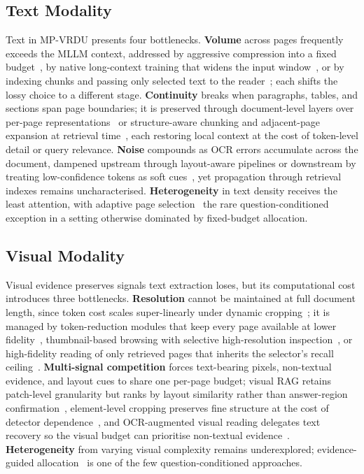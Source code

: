 \documentclass[11pt]{article}
\begin{document}
\subsection{Text Modality}
\label{sec:modality-text}
Text in MP-VRDU presents four bottlenecks. \textbf{Volume} across pages frequently exceeds the MLLM context, addressed by aggressive compression into a fixed budget~\cite{borchmann2025arctic, dong2024multi}, by native long-context training that widens the input window~\cite{duan2025docopilot}, or by indexing chunks and passing only selected text to the reader~\cite{xie2024wukong, zhang2024cream}; each shifts the lossy choice to a different stage. \textbf{Continuity} breaks when paragraphs, tables, and sections span page boundaries; it is preserved through document-level layers over per-page representations~\cite{tito2023hierarchical, blau2024gram} or structure-aware chunking and adjacent-page expansion at retrieval time~\cite{shin2025multidocfusion, qian2026accurate}, each restoring local context at the cost of token-level detail or query relevance. \textbf{Noise} compounds as OCR errors accumulate across the document, dampened upstream through layout-aware pipelines or downstream by treating low-confidence tokens as soft cues~\cite{hannan2025docslm}, yet propagation through retrieval indexes remains uncharacterised. \textbf{Heterogeneity} in text density receives the least attention, with adaptive page selection~\cite{li2025avir} the rare question-conditioned exception in a setting otherwise dominated by fixed-budget allocation.

\subsection{Visual Modality}
\label{sec:modality-visual}
Visual evidence preserves signals text extraction loses, but its computational cost introduces three bottlenecks. \textbf{Resolution} cannot be maintained at full document length, since token cost scales super-linearly under dynamic cropping~\cite{zheng2026docvstar}; it is managed by token-reduction modules that keep every page available at lower fidelity~\cite{hu2025mplug2, yu2024texthawk2, jia2024leopard}, thumbnail-based browsing with selective high-resolution inspection~\cite{zheng2026docvstar, jain2025simpledoc}, or high-fidelity reading of only retrieved pages that inherits the selector's recall ceiling~\cite{zhu2025doclens, yan2025docseeker}. \textbf{Multi-signal competition} forces text-bearing pixels, non-textual evidence, and layout cues to share one per-page budget; visual RAG retains patch-level granularity but ranks by layout similarity rather than answer-region confirmation~\cite{cho2024m3docrag, tanaka2025vdocrag}, element-level cropping preserves fine structure at the cost of detector dependence~\cite{zhu2025doclens}, and OCR-augmented visual reading delegates text recovery so the visual budget can prioritise non-textual evidence~\cite{hannan2025docslm}. \textbf{Heterogeneity} from varying visual complexity remains underexplored; evidence-guided allocation~\cite{yan2025docseeker} is one of the few question-conditioned approaches.
\end{document}
